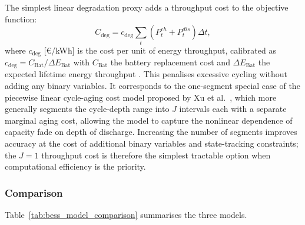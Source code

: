 \documentclass[11pt,a4paper]{report}
\begin{document}
The simplest linear degradation proxy adds a throughput cost to the objective function:
\begin{equation}
    C_{\text{deg}} = c_{\text{deg}} \sum_{t} \left(P^{ch}_t + P^{dis}_t\right)\Delta t,
    \label{eq:bess_deg}
\end{equation}
where $c_{\text{deg}}$ [\euro/kWh] is the cost per unit of energy throughput, calibrated as $c_{\text{deg}} = C_{\text{Bat}} / \Delta E_{\text{Bat}}$ with $C_{\text{Bat}}$ the battery replacement cost and $\Delta E_{\text{Bat}}$ the expected lifetime energy throughput \cite{Xu2018BatteryAging}.
This penalises excessive cycling without adding any binary variables.
It corresponds to the one-segment special case of the piecewise linear cycle-aging cost model proposed by Xu et al.~\cite{Xu2018BatteryAging}, which more generally segments the cycle-depth range into $J$ intervals each with a separate marginal aging cost, allowing the model to capture the nonlinear dependence of capacity fade on depth of discharge.
Increasing the number of segments improves accuracy at the cost of additional binary variables and state-tracking constraints; the $J=1$ throughput cost is therefore the simplest tractable option when computational efficiency is the priority.

\subsubsection{Comparison}

Table~\ref{tab:bess_model_comparison} summarises the three models.

\begin{table}[H]
\centering
\caption{Comparison of BESS modeling approaches for MILP-based building energy optimization.}
\label{tab:bess_model_comparison}
\end{table}
\end{document}
